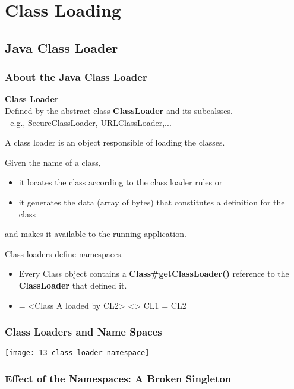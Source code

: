 \section{Class Loading}

\subsection{Java Class Loader}

\subsubsection{About the Java Class Loader}

\textbf{Class Loader}
\\
Defined by the abstract class \textbf{ClassLoader} and its subcalsses.\\
- e.g., SecureClassLoader, URLClassLoader,...

A class loader is an object responsible of loading the classes.

Given the name of a class,

\begin{itemize}
	\item it locates the class according to the class loader rules or
	\item it generates the data (array of bytes) that constitutes a definition for the class
\end{itemize}

and makes it available to the running application.

Class loaders define namespaces.

\begin{itemize}
	\item Every Class object contains a \textbf{Class\#getClassLoader()} reference to the \textbf{ClassLoader} that defined it.
	\item <Class A loaded by CL1> = <Class A loaded by CL2> <> CL1 = CL2
\end{itemize}

\subsubsection{Class Loaders and Name Spaces}

\begin{center}
\texttt{[image: 13-class-loader-namespace]}
\end{center}

\subsubsection{Effect of the Namespaces: A Broken Singleton}

